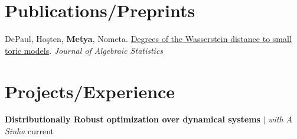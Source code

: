 \section{Publications/Preprints}





\begin{etaremune}[leftmargin=13pt]
\item {\color{grey}DePaul, Ho\c{s}ten, \textbf{Metya}, Nometa}. \href{https://arxiv.org/abs/2402.09626}{Degrees of the Wasserstein distance to small toric models}.
\textit{Journal of Algebraic Statistics}
\end{etaremune}
\vspace{\mygap}


\section{Projects/Experience}
\resumeSubHeadingListStart


\resumeProjectHeading
{\textbf{Distributionally Robust optimization over dynamical systems} $|$ \textit{\color{gray}with A Sinha}}
{current}
{}
\vspace{\mygap}

